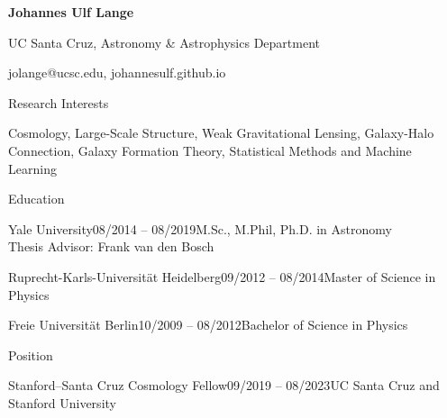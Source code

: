 \documentclass{resume}
\begin{document}
\centerline{\color{blue} \LARGE \bf Johannes Ulf Lange}
\centerline{UC Santa Cruz, Astronomy \& Astrophysics Department}
\centerline{jolange@ucsc.edu, johannesulf.github.io}
\medskip

\begin{rSection}{Research Interests}
  \begin{adjustwidth}{0.5cm}{}
    Cosmology, Large-Scale Structure, Weak Gravitational Lensing, Galaxy-Halo Connection, Galaxy Formation Theory, Statistical Methods and Machine Learning
  \end{adjustwidth}
\end{rSection}

\begin{rSection}{Education}
  \begin{adjustwidth}{0.5cm}{}
    \begin{rSubsection}{Yale University}{08/2014 -- 08/2019}{M.Sc., M.Phil, Ph.D. in Astronomy\\Thesis Advisor: Frank van den Bosch}{}\end{rSubsection}

    \begin{rSubsection}{Ruprecht-Karls-Universität Heidelberg}{09/2012 -- 08/2014}{Master of Science in Physics}{}\end{rSubsection}

    \begin{rSubsection}{Freie Universität Berlin}{10/2009 -- 08/2012}{Bachelor of Science in Physics}{}\end{rSubsection}
  \end{adjustwidth}
\end{rSection}

\begin{rSection}{Position}
  \begin{adjustwidth}{0.5cm}{}
    \begin{rSubsection}{Stanford--Santa Cruz Cosmology Fellow}{09/2019 -- 08/2023}{UC Santa Cruz and Stanford University}{}\end{rSubsection}
  \end{adjustwidth}
\end{rSection}
\end{document}
